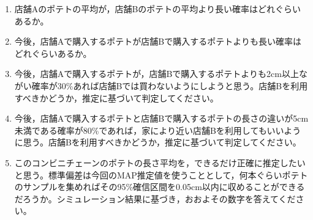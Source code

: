\begin{enumerate}
	\item 店舗Aのポテトの平均が，店舗Bのポテトの平均より長い確率はどれぐらいあるか。
	\item 今後，店舗Aで購入するポテトが店舗Bで購入するポテトよりも長い確率はどれぐらいあるか。
	\item 今後，店舗Aで購入するポテトが，店舗Bで購入するポテトよりも2cm以上ながい確率が30\%あれば店舗Bでは買わないようにしようと思う。店舗Bを利用すべきかどうか，推定に基づいて判定してください。
	\item 今後，店舗Aで購入するポテトと店舗Bで購入するポテトの長さの違いが5cm未満である確率が80\%であれば，家により近い店舗Bを利用してもいいように思う。店舗Bを利用すべきかどうか，推定に基づいて判定してください。
	\item このコンビニチェーンのポテトの長さ平均を，できるだけ正確に推定したいと思う。標準偏差は今回のMAP推定値を使うこととして，何本ぐらいポテトのサンプルを集めればその95\%確信区間を0.05cm以内に収めることができるだろうか。シミュレーション結果に基づき，おおよその数字を答えてください。
\end{enumerate}
